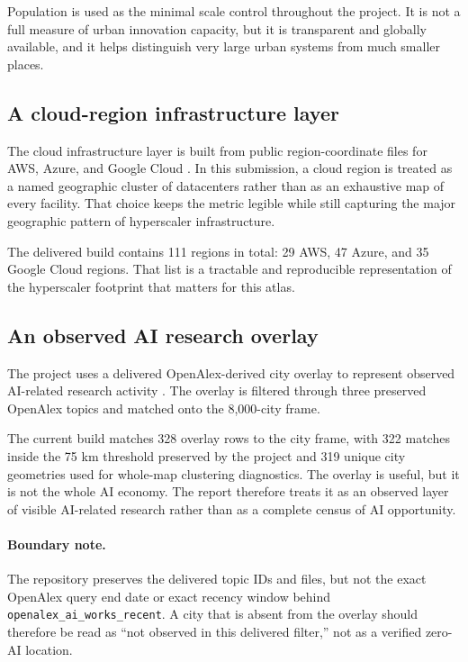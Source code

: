 \documentclass[11pt]{article}
\begin{document}
Population is used as the minimal scale control throughout the project. It is not a full measure of urban innovation capacity, but it is transparent and globally available, and it helps distinguish very large urban systems from much smaller places.

\subsection{A cloud-region infrastructure layer}
The cloud infrastructure layer is built from public region-coordinate files for AWS, Azure, and Google Cloud \citep{cloudregions}. In this submission, a cloud region is treated as a named geographic cluster of datacenters rather than as an exhaustive map of every facility. That choice keeps the metric legible while still capturing the major geographic pattern of hyperscaler infrastructure.



The delivered build contains 111 regions in total: 29 AWS, 47 Azure, and 35 Google Cloud regions. That list is a tractable and reproducible representation of the hyperscaler footprint that matters for this atlas.

\subsection{An observed AI research overlay}
The project uses a delivered OpenAlex-derived city overlay to represent observed AI-related research activity \citep{openalex}. The overlay is filtered through three preserved OpenAlex topics and matched onto the 8,000-city frame.



The current build matches 328 overlay rows to the city frame, with 322 matches inside the 75 km threshold preserved by the project and 319 unique city geometries used for whole-map clustering diagnostics. The overlay is useful, but it is not the whole AI economy. The report therefore treats it as an observed layer of visible AI-related research rather than as a complete census of AI opportunity.

\paragraph{Boundary note.}
The repository preserves the delivered topic IDs and files, but not the exact OpenAlex query end date or exact recency window behind \texttt{openalex\_ai\_works\_recent}. A city that is absent from the overlay should therefore be read as ``not observed in this delivered filter,'' not as a verified zero-AI location.
\end{document}
